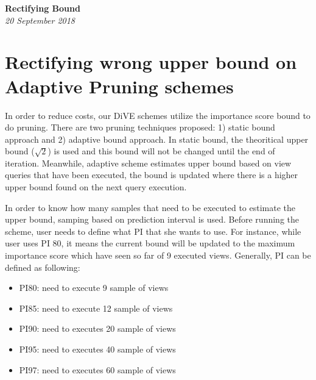 \documentclass{article}
\begin{document}
\begin{titlepage}
	\begin{center}
		\Large\textbf{Rectifying Bound}\\
		\large\textit{20 September 2018}
	\end{center}
\end{titlepage}














\section{Rectifying wrong upper bound on Adaptive Pruning schemes}


In order to reduce costs, our DiVE schemes utilize the importance score bound to do pruning. There are two pruning techniques proposed: 1) static bound approach and 2) adaptive bound approach. In static bound, the theoritical upper bound ($ \sqrt{2} $) is used and this bound will not be changed until the end of iteration. Meanwhile, adaptive scheme estimates upper bound based on view queries that have been executed, the bound is updated where there is a higher upper bound found on the next query execution. 


In order to know how many samples that need to be executed to estimate the upper bound, samping based on prediction interval is used. Before running the scheme, user needs to define what PI that she wants to use. For instance, while user uses PI 80, it means the current bound will be updated to the maximum importance score which have seen so far of 9 executed views. Generally, PI can be defined as following: 


\begin{itemize}[noitemsep]
	\item PI80: need to execute 9 sample of views
	\item PI85: need to execute 12 sample of views
	\item PI90: need to executes 20 sample of views
	\item PI95: need to executes 40 sample of views
	\item PI97: need to executes 60 sample of views
\end{itemize}
\end{document}
